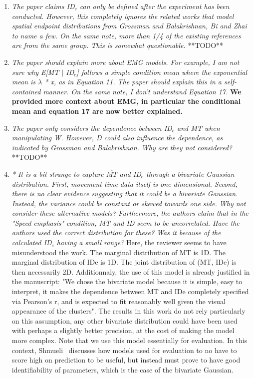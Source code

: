 \documentclass{article}
\begin{document}
\begin{enumerate}
    \item \textit{The paper claims ID$_e$ can only be defined after the experiment has been conducted. However, this completely ignores the related works that model spatial endpoint distributions from Grossman and Balakrishnan, Bi and Zhai to name a few. On the same note, more than 1/4 of the existing references are from the same group. This is somewhat questionable.} **TODO**
    \item \textit{The paper should explain more about EMG models. For example, I am not sure why E[MT $\vert$ ID$_e$] follows a simple condition mean where the exponential mean is $\lambda$ * x, as in Equation 11. The paper should explain this in a self-contained manner. On the same note, I don't understand Equation 17.} \textbf{We provided more context about EMG, in particular the conditional mean and equation 17 are now better explained.}
    \item \textit{The paper only considers the dependence between ID$_e$ and MT when manipulating W. However, D could also influence the dependence, as indicated by Grossman and Balakrishnan. Why are they not considered?} **TODO**
    \item \textit{* It is a bit strange to capture $\overline{MT}$ and ID$_e$ through a bivariate Gaussian distribution. First, movement time data itself is one-dimensional. Second, there is no clear evidence suggesting that it
    could be a bivariate Gaussian. Instead, the variance could be constant
    or skewed towards one side. Why not consider these alternative models?
    Furthermore, the authors claim that in the "Speed emphasis" condition,
    MT and ID seem to be uncorrelated. Have the authors used the correct
    distribution for these? Was it because of the calculated ID$_e$ having a
    small range?} Here, the reviewer seems to have misunderstood the work. The marginal distribution of MT is 1D. The marginal distribution of IDe is 1D. The joint distribution of (MT, IDe) is then necessarily 2D. Additionnaly, the use of this model is already justified in the manuscript: "We chose the bivariate model because it is simple, easy to interpret, it makes the dependence between MT and IDe completely specified via Pearson's r, and is expected to fit reasonably well given the visual appearance of the clusters". The results in this work do not rely particularly on this assumption, any other bivariate distribution could have been used with perhaps a slightly better precision, at the cost of making the model more complex. Note that we use this model essentially for evaluation. In this context, Shmueli~\cite{shmueli2010} discusses how models used for evaluation to no have to score high on prediction to be useful, but instead must prove to have good identifiability of parameters, which is the case of the bivariate Gaussian.

\end{enumerate}
\end{document}
